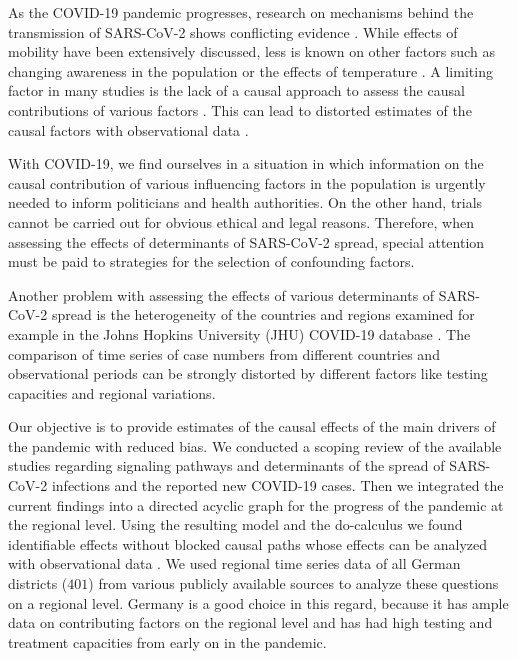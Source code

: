 \documentclass[]{elsarticle} %
\begin{document}
As the COVID-19 pandemic progresses, research on mechanisms behind the transmission of SARS-CoV-2 shows conflicting evidence \citep{who2020report, Chinazzi395, guan2020clinical}. While effects of mobility have been extensively discussed, less is known on other factors such as changing awareness in the population \citep{higgins_correlations_2020, li_retrospective_2020, yuan_trends_2020} or the effects of temperature \citep{bannister-tyrrell_preliminary_2020, demongeot_temperature_2020, liu_impact_2020}. A limiting factor in many studies is the lack of a causal approach to assess the causal contributions of various factors \citep{Greenland1999}. This can lead to distorted estimates of the causal factors with observational data \citep{Greenland1999, schipf_directed_2011, textor_robust_2017}.

With COVID-19, we find ourselves in a situation in which information on the causal contribution of various influencing factors in the population is urgently needed to inform politicians and health authorities. On the other hand, trials cannot be carried out for obvious ethical and legal reasons. Therefore, when assessing the effects of determinants of SARS-CoV-2 spread, special attention must be paid to strategies for the selection of confounding factors.

Another problem with assessing the effects of various determinants of SARS-CoV-2 spread is the heterogeneity of the countries and regions examined for example in the Johns Hopkins University (JHU) COVID-19 database \citep{jhucovid19db2020}. The comparison of time series of case numbers from different countries and observational periods can be strongly distorted by different factors like testing capacities and regional variations.

Our objective is to provide estimates of the causal effects of the main drivers of the pandemic with reduced bias. We conducted a scoping review of the available studies regarding signaling pathways and determinants of the spread of SARS-CoV-2 infections and the reported new COVID-19 cases. Then we integrated the current findings into a directed acyclic graph for the progress of the pandemic at the regional level. Using the resulting model and the do-calculus we found identifiable effects without blocked causal paths whose effects can be analyzed with observational data \citep{Pearl_2014}. We used regional time series data of all German districts (\(401\)) from various publicly available sources to analyze these questions on a regional level. Germany is a good choice in this regard, because it has ample data on contributing factors on the regional level and has had high testing and treatment capacities from early on in the pandemic.
\end{document}
